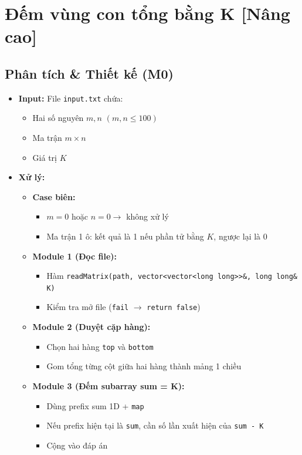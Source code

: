 \section{Đếm vùng con tổng bằng K [Nâng cao]}
\subsection{Phân tích \& Thiết kế (M0)}
\begin{itemize}
    \item \textbf{Input:}
    File \texttt{input.txt} chứa:
    \begin{itemize}
        \item Hai số nguyên $m, n$ $(m,n \le 100)$
        \item Ma trận $m \times n$
        \item Giá trị $K$
    \end{itemize}

    \item \textbf{Xử lý:}
    \begin{itemize}
        \item \textbf{Case biên:}
        \begin{itemize}
            \item $m = 0$ hoặc $n = 0 \rightarrow$ không xử lý
            \item Ma trận 1 ô: kết quả là 1 nếu phần tử bằng $K$, ngược lại là 0
        \end{itemize}

        \item \textbf{Module 1 (Đọc file):}
        \begin{itemize}
            \item Hàm \texttt{readMatrix(path, vector<vector<long long>>\&, long long\& K)}
            \item Kiểm tra mở file (\texttt{fail} $\rightarrow$ \texttt{return false})
        \end{itemize}

        \item \textbf{Module 2 (Duyệt cặp hàng):}
        \begin{itemize}
            \item Chọn hai hàng \texttt{top} và \texttt{bottom}
            \item Gom tổng từng cột giữa hai hàng thành mảng 1 chiều
        \end{itemize}

        \item \textbf{Module 3 (Đếm subarray sum = K):}
        \begin{itemize}
            \item Dùng prefix sum 1D + \texttt{map}
            \item Nếu prefix hiện tại là \texttt{sum}, cần số lần xuất hiện của \texttt{sum - K}
            \item Cộng vào đáp án
        \end{itemize}


\end{itemize}
\end{itemize}
